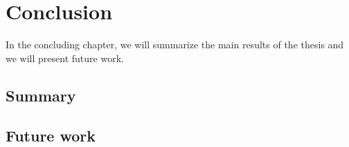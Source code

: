 
\chapter{Conclusion}\label{cap:conclusion}
In the concluding chapter, we will summarize the main results of the thesis and we will present future work.
\section{Summary}
\section{Future work}
\cite[Testing]{CormenIA}
